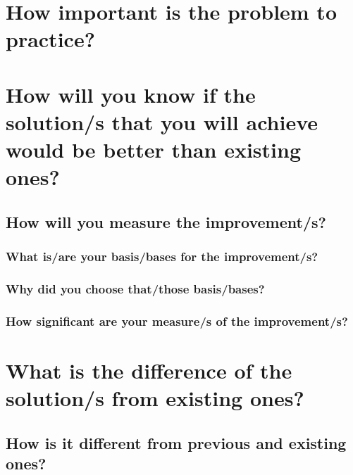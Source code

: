 


\section{How important is the problem to practice?}

\blindtext
	
	
	
	
\section{How will you know if the solution/s that you will achieve would be better than existing ones?}	

\blindtext

\subsection{How will you measure the improvement/s?}	

\blindtext
	
\subsubsection{What is/are your basis/bases for the improvement/s?}

\blindtext
		
\subsubsection{Why did you choose that/those basis/bases?}

\blindtext
				
\subsubsection{How significant are your measure/s of the improvement/s?}

\blindtext






	
\section{What is the difference of the solution/s from existing ones?}
	
\blindtext

\subsection{How is it different from previous and existing ones?}

